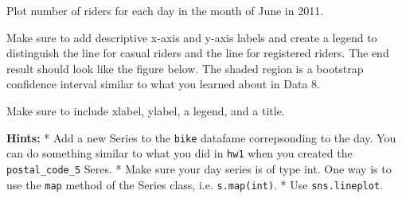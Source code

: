 \documentclass[11pt]{article}
\begin{document}
Plot number of riders for each day in the month of June in 2011.

Make sure to add descriptive x-axis and y-axis labels and create a
legend to distinguish the line for casual riders and the line for
registered riders. The end result should look like the figure below. The
shaded region is a bootstrap confidence interval similar to what you
learned about in Data 8.

Make sure to include xlabel, ylabel, a legend, and a title.

\textbf{Hints:} * Add a new Series to the \texttt{bike} datafame
correpsonding to the day. You can do something similar to what you did
in \texttt{hw1} when you created the \texttt{postal\_code\_5} Seres. *
Make sure your day series is of type int. One way is to use the
\texttt{map} method of the Series class, i.e. \texttt{s.map(int)}. * Use
\texttt{sns.lineplot}.
\end{document}
